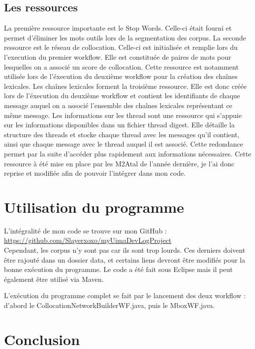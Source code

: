 \documentclass[a4paper]{article}
\begin{document}
	\subsection{Les ressources}
	La première ressource importante est le Stop Words. Celle-ci était fourni et permet d'éliminer les mots outils lors de la segmentation des corpus. 
La seconde ressource est le réseau de collocation. Celle-ci est initialisée et remplie lors du l'execution du premier workflow. Elle est constituée de paires de mots pour lesquelles on a associé un score de collocation. Cette ressource est notamment utilisée lors de l'éxecution du deuxième workflow pour la création des chaînes lexicales. 
Les chaînes lexicales forment la troisième ressource. Elle est donc créée lors de l'éxecution du deuxième workflow et contient les identifiants de chaque message auquel on a associé l'ensemble des chaînes lexicales représentant ce même message. 
Les informations sur les thread sont une ressource qui s’appuie sur les informations disponibles dans un fichier thread digest. Elle détaille la structure des threads et stocke chaque thread avec les messages qu’il contient, ainsi que chaque message avec le thread auquel il est associé. Cette redondance permet par la suite d’accéder plus rapidement aux informations nécessaires. Cette ressource à été mise en place par les M2Atal de l'année dernière, je l'ai donc reprise et modifiée afin de pouvoir l'intégrer dans mon code.
	
	
	\section{Utilisation du programme}

	L'intégralité de mon code se trouve sur mon GitHub : \url{https://github.com/Slayerxoxo/myUimaDevLogProject}\\
	
Cependant, les corpus n'y sont pas car ils sont trop lourds. Ces derniers doivent être rajouté dans un dossier data, et certains liens devront être modifiés pour la bonne exécution du programme. Le code a été fait sous Eclipse mais il peut également être utilisé via Maven. 

L'exécution du programme complet se fait par le lancement des deux workflow : d'abord le CollocationNetworkBuilderWF.java, puis le MboxWF.java.


	\section*{Conclusion}
\end{document}

